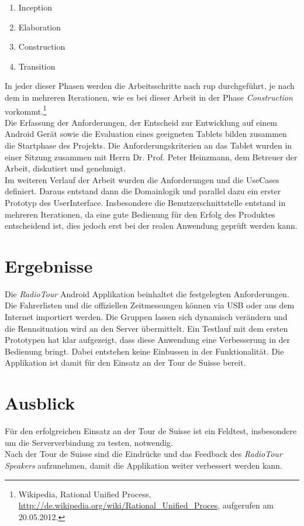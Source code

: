 \begin{enumerate}
\item Inception
\item Elaboration
\item Construction
\item Transition
\end{enumerate}

In jeder dieser Phasen werden die Arbeitsschritte nach \gls{rup} durchgeführt, je nach dem in mehreren Iterationen, wie es bei dieser Arbeit in der Phase \textit{Construction} vorkommt.\footnote{Wikipedia, Rational Unified Process,  \url{http://de.wikipedia.org/wiki/Rational_Unified_Proces}, aufgerufen am 20.05.2012.}
\\
Die Erfassung der Anforderungen, der Entscheid zur Entwicklung auf einem Android Gerät sowie die Evaluation eines geeigneten Tablets bilden zusammen die Startphase des Projekts. Die Anforderungskriterien an das Tablet wurden in einer Sitzung zusammen mit Herrn Dr. Prof. Peter Heinzmann, dem Betreuer der Arbeit, diskutiert und genehmigt.
\\
Im weiteren Verlauf der Arbeit wurden die Anforderungen und die UseCases definiert. Daraus entstand dann die Domainlogik und parallel dazu ein erster Prototyp des UserInterface. Insbesondere die Benutzerschnittstelle entstand in mehreren Iterationen, da eine gute Bedienung für den Erfolg des Produktes entscheidend ist, dies jedoch erst bei der realen Anwendung geprüft werden kann.

\section*{Ergebnisse}
Die \textit{RadioTour} Android Applikation beinhaltet die festgelegten Anforderungen. Die Fahrerlisten und die offiziellen Zeitmessungen können via USB oder aus dem Internet importiert werden. Die Gruppen lassen sich dynamisch verändern und die Rennsituation wird an den Server übermittelt. Ein Testlauf mit dem ersten Prototypen hat klar aufgezeigt, dass diese Anwendung eine Verbesserung in der Bedienung bringt. Dabei entstehen keine Einbussen in der Funktionalität. Die Applikation ist damit für den Einsatz an der Tour de Suisse bereit.


\section*{Ausblick}
Für den erfolgreichen Einsatz an der Tour de Suisse ist ein Feldtest, insbesondere um die Serververbindung zu testen, notwendig.
\\
Nach der Tour de Suisse sind die Eindrücke und das Feedback des \textit{RadioTour Speakers} aufzunehmen, damit die Applikation weiter verbessert werden kann.